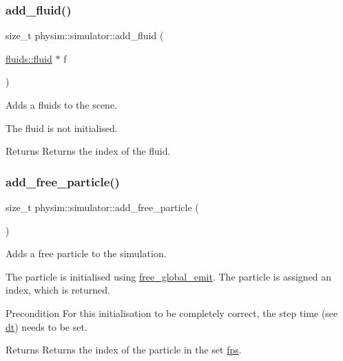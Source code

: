 \subsubsection{\texorpdfstring{add\+\_\+fluid()}{add\_fluid()}}
{\footnotesize\ttfamily size\+\_\+t physim\+::simulator\+::add\+\_\+fluid (\begin{DoxyParamCaption}\item[{\hyperlink{classphysim_1_1fluids_1_1fluid}{fluids\+::fluid} $\ast$}]{f }\end{DoxyParamCaption})}



Adds a fluids to the scene. 

The fluid is not initialised. \begin{DoxyReturn}{Returns}
Returns the index of the fluid. 
\end{DoxyReturn}
\mbox{\label{classphysim_1_1simulator_a6d2b636673f895b006724a6ba310e322}} 
\subsubsection{\texorpdfstring{add\+\_\+free\+\_\+particle()}{add\_free\_particle()}\hspace{0.1cm}{\footnotesize\ttfamily [1/2]}}
{\footnotesize\ttfamily size\+\_\+t physim\+::simulator\+::add\+\_\+free\+\_\+particle (\begin{DoxyParamCaption}{ }\end{DoxyParamCaption})}



Adds a free particle to the simulation. 

The particle is initialised using \hyperlink{classphysim_1_1simulator_a05e2840fc39c644d7005ea938e63202f}{free\+\_\+global\+\_\+emit}. The particle is assigned an index, which is returned. \begin{DoxyPrecond}{Precondition}
For this initialisation to be completely correct, the step time (see \hyperlink{classphysim_1_1simulator_a12a60d0ed819937b51ce50162dbdd6e1}{dt}) needs to be set. 
\end{DoxyPrecond}
\begin{DoxyReturn}{Returns}
Returns the index of the particle in the set \hyperlink{classphysim_1_1simulator_a4f92b1da1d5e8e0c35d6339991b4d7ce}{fps}. 
\end{DoxyReturn}
\mbox{\label{classphysim_1_1simulator_adc50e1ec0da019bf120db3ae5af27d39}} 
